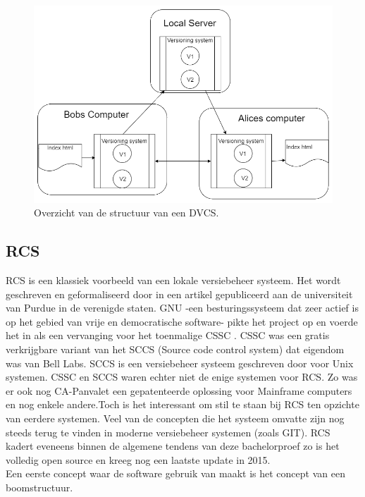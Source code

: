 \begin{itemize}
\begin{figure}[h!]
	\centering
	\caption[Overzicht structuur DVCS]{Overzicht van de structuur van een DVCS.}
	\label{fig:lvcs}
	\includegraphics[scale=0.5]{DVCS.png}
\end{figure}

\end{itemize}

\subsection{RCS}

RCS is een klassiek voorbeeld van een lokale versiebeheer systeem. Het wordt geschreven en geformaliseerd door \textcite{Tichy85rcs} in een artikel gepubliceerd aan de universiteit van Purdue in de verenigde staten. GNU -een besturingssysteem dat zeer actief is op het gebied van vrije en democratische software- pikte het project op en voerde het in als een vervanging voor het toenmalige CSSC \autocite{GNUCSSC}. CSSC was een gratis verkrijgbare variant van het SCCS (Source code control system) dat eigendom was van Bell Labs. SCCS is een versiebeheer systeem geschreven door \textcite{Rochkind1975} voor Unix systemen. CSSC en SCCS waren echter niet de enige systemen voor RCS. Zo was er ook nog CA-Panvalet een gepatenteerde oplossing voor Mainframe computers en nog enkele andere.Toch is het interessant om stil te staan bij RCS ten opzichte van eerdere systemen. Veel van de concepten die het systeem omvatte zijn nog steeds terug te vinden in moderne versiebeheer systemen (zoals GIT). RCS kadert eveneens binnen de algemene tendens van deze bachelorproef zo is het volledig open source en kreeg nog een laatste update in 2015.\\

Een eerste concept waar de software gebruik van maakt is het concept van een boomstructuur.
